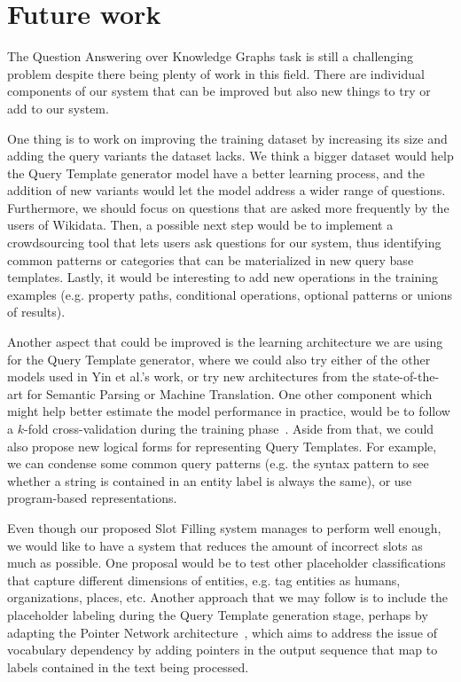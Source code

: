 \section{Future work}
\label{cap6:conclusions/futureWork}
The Question Answering over Knowledge Graphs task is still a challenging problem despite there being 
plenty of work in this field. There are individual components of our system that can be improved but 
also new things to try or add to our system.

One thing is to work on improving the training dataset by increasing its size and adding the \SPARQL{} 
query variants the \LCQuADtwo{} dataset lacks. We think a bigger dataset would help the Query Template 
generator model have a better learning process, and the addition of new variants would let the model 
address a wider range of questions. Furthermore, we should focus on questions that are asked more 
frequently by the users of Wikidata. Then, a possible next step would be to implement a crowdsourcing 
tool that lets users ask questions for our system, thus identifying common patterns or categories 
that can be materialized in new query base templates. Lastly, it would be interesting to add new 
operations in the training examples (e.g. property paths, conditional operations, optional patterns 
or unions of results).

Another aspect that could be improved is the learning architecture we are using for the Query 
Template generator, where we could also try either of the other models used in Yin et al.'s work, or 
try new architectures from the state-of-the-art for Semantic Parsing or Machine Translation. One 
other component which might help better estimate the model performance in practice, would be to 
follow a $k$-fold cross-validation during the training phase~\cite{futureWork:anguita2012k}. Aside 
from that, we could also propose new logical forms for representing Query Templates. For example, we 
can condense some common query patterns (e.g. the syntax pattern to see whether a string is contained 
in an entity label is always the same), or use program-based representations. 

Even though our proposed Slot Filling system manages to perform well enough, we would like to have a 
system that reduces the amount of incorrect slots as much as possible. One proposal would be to 
test other placeholder classifications that capture different dimensions of entities, e.g. tag 
entities as humans, organizations, places, etc. Another approach that we may 
follow is to include the placeholder labeling during the Query Template generation stage, perhaps by 
adapting the Pointer Network architecture~\cite{key:vinyals2015pointer}, which 
aims to address the issue of vocabulary dependency by adding pointers in the output sequence that 
map to labels contained in the text being processed.

